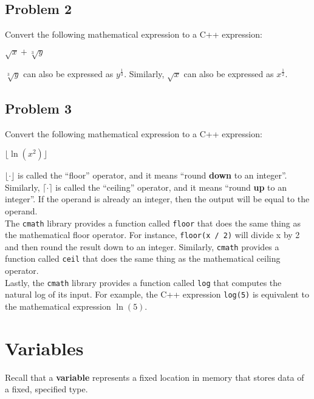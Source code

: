 \documentclass{article}
\newenvironment{hint}
    {\begin{tcolorbox}[title=Hint,colframe=white!70!blue,colback=white]}
    {\end{tcolorbox}}
\begin{document}
\subsection{Problem 2}

Convert the following mathematical expression to a C++ expression:

$\sqrt{x} + \sqrt[3]{y}$

\begin{hint}
    $\sqrt[3]{y}$ can also be expressed as $y^\frac{1}{3}$. Similarly, $\sqrt{x}$ can also be expressed as $x^\frac{1}{2}$.
\end{hint}

\subsection{Problem 3}
\label{floor}

Convert the following mathematical expression to a C++ expression:

$\lfloor \ln (x^2) \rfloor$

\begin{hint}
    $\lfloor \cdot \rfloor$ is called the ``floor'' operator, and it means ``round \textbf{down} to an integer''. Similarly, $\lceil \cdot \rceil$ is called the ``ceiling'' operator, and it means ``round \textbf{up} to an integer''. If the operand is already an integer, then the output will be equal to the operand.\\

    The \texttt{cmath} library provides a function called \texttt{floor} that does the same thing as the mathematical floor operator. For instance, \texttt{floor(x / 2)} will divide x by 2 and then round the result down to an integer. Similarly, \texttt{cmath} provides a function called \texttt{ceil} that does the same thing as the mathematical ceiling operator.\\

    Lastly, the \texttt{cmath} library provides a function called \texttt{log} that computes the natural log of its input. For example, the C++ expression \texttt{log(5)} is equivalent to the mathematical expression $\ln(5)$.
\end{hint}

\clearpage

\section{Variables}

Recall that a \textbf{variable} represents a fixed location in memory that stores data of a fixed, specified type.
\end{document}
